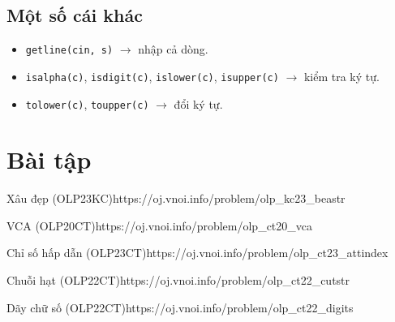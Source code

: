 \subsection{Một số cái khác}
\begin{itemize}
    \item \texttt{getline(cin, s)} $\to$ nhập cả dòng.
    \item \texttt{isalpha(c)}, \texttt{isdigit(c)}, \texttt{islower(c)}, \texttt{isupper(c)} $\to$ kiểm tra ký tự.
    \item \texttt{tolower(c)}, \texttt{toupper(c)} $\to$ đổi ký tự.
\end{itemize}

\section{Bài tập}

\begin{baitap}{Xâu đẹp (OLP23KC)}{https://oj.vnoi.info/problem/olp\_kc23\_beastr}
\end{baitap}



\begin{baitap}{VCA (OLP20CT)}{https://oj.vnoi.info/problem/olp\_ct20\_vca}
\end{baitap}


\begin{baitap}{Chỉ số hấp dẫn (OLP23CT)}{https://oj.vnoi.info/problem/olp\_ct23\_attindex}

\end{baitap}



\begin{baitap}{Chuỗi hạt (OLP22CT)}{https://oj.vnoi.info/problem/olp\_ct22\_cutstr}

\end{baitap}

\begin{baitap}{Dãy chữ số (OLP22CT)}{https://oj.vnoi.info/problem/olp\_ct22\_digits}

\end{baitap}